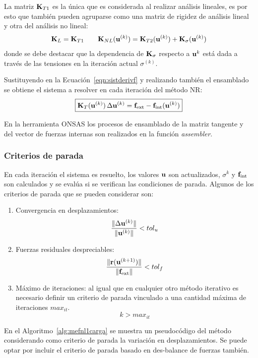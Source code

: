 La matriz ${\bf K}_{T1}$ es la única que es considerada al realizar análisis lineales, es por esto que también pueden agruparse como una matriz de rigidez de análisis lineal y otra del análisis no lineal:
\begin{equation}
{\bf K}_L = {\bf K}_{T1} \qquad {\bf K}_{NL} ({\bf u}^{(k)}) = {\bf K}_{T2}({\bf u}^{(k)}) + {\bf K}_{\sigma}({\bf u}^{(k)})
\end{equation}
%
donde se debe destacar que la dependencia de ${\bf K}_{\sigma}$ respecto a ${\bf u}^k$ está dada a través de las tensiones en la iteración actual $\sigma^{(k)}$.

Sustituyendo en la Ecuación~\eqref{eqn:sistderivf} y realizando también el ensamblado se obtiene el sistema a resolver en cada iteración del método NR:
%
\begin{equation}
\boxed{
	{\bf K}_{T} ({\bf u}^{(k)}) \, \Delta {\bf u}^{(k)} = {\bf f}_{\text{ext}} - {\bf f}_{\text{int}}({\bf u}^{(k)})
}
\end{equation}

En la herramienta ONSAS los procesos de ensamblado de la matriz tangente y del vector de fuerzas internas son realizados en la función \textit{assembler}.

\subsubsection{Criterios de parada}
En cada iteración el sistema es resuelto, los valores ${\bf u}$ son actualizados, $\sigma^k$ y ${\bf f}_{\text{int}}$ son calculados y se evalúa si se verifican las condiciones de parada. %
%
Algunos de los criterios de parada que se pueden considerar son:
%
\begin{enumerate}
	\item Convergencia en desplazamientos:
	$$ \dfrac{ \|\Delta {\bf u}^{(k)} \|}{\| {\bf u}^{(k)} \|} < tol_u $$
	\item Fuerzas residuales despreciables:
	$$ \dfrac{\|{\bf r} ( {\bf u}^{(k+1)} ) \|}{\| {\bf f}_{\text{ext}} \|} < tol_f $$
	\item Máximo de iteraciones: al igual que en cualquier otro método iterativo es necesario definir un criterio de parada vinculado a una cantidad máxima de iteraciones $max_{it}$.
	$$k > max_{it}$$
\end{enumerate}


En el Algoritmo~\ref{alg:mefnl1carga} se muestra un pseudocódigo del método considerando como criterio de parada la variación en desplazamientos. %
%
Se puede optar por incluir el criterio de parada basado en des-balance de fuerzas también.

